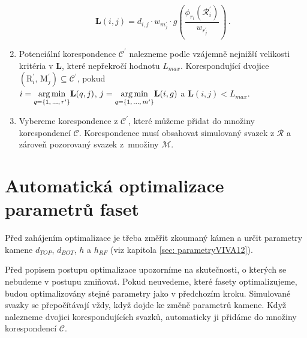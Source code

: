 \begin{enumerate}
\begin{equation}
\mathbf{L}(i,j) = d_{i,j}\cdot w_{m^\prime_{j}} \cdot g \left(\dfrac{\phi_{r_i}(\mathcal{R}^\prime_i)}{w_{r^\prime_{j}}} \right)\,. 
\label{eq: L_tok}
\end{equation}


\item Potenciální korespondence $\mathcal{C}^\prime$ nalezneme podle vzájemně nejnižší velikosti  kritéria v $\mathbf{L}$, které nepřekročí hodnotu $L_{max}$. Korespondující dvojice $\left(\mathrm{R}^\prime_i,\,\mathrm{M}^\prime_j \right) \subseteq \mathcal{C}^\prime$, pokud\\ $i = \underset{{q = \lbrace1,\,\dots,\,r^\prime\rbrace}}{\operatorname*{arg\,min}}\mathbf{L}(q,j)$, $j = \underset{{q = \lbrace1,\,\dots,\,m^\prime\rbrace}}{\operatorname*{arg\,min}}\mathbf{L}(i,g)$ a  $\mathbf{L}(i,j) < L_{max}$. 

\item Vybereme korespondence z $\mathcal{C}^\prime$, které můžeme přidat do množiny korespondencí $\mathcal{C}$. Korespondence musí obsahovat simulovaný svazek z $\mathcal{R}$ a zároveň pozorovaný svazek z~množiny $\mathcal{M}$. 
\end{enumerate}

\section{Automatická optimalizace parametrů faset}
\label{sec: auto}

Před zahájením optimalizace je třeba změřit zkoumaný kámen a určit parametry kamene $d_{TOP}$, $d_{BOT}$, $h$ a $h_{RF}$ (viz kapitola \ref{sec: parametryVIVA12}). 

Před popisem postupu optimalizace upozorníme na skutečnosti, o kterých se nebudeme v postupu zmiňovat. Pokud neuvedeme, které fasety optimalizujeme, budou optimalizovány stejné parametry jako v předchozím kroku. Simulované svazky se přepočítávají vždy, když dojde ke změně parametrů kamene. Když nalezneme dvojici korespondujících svazků, automaticky ji přidáme do množiny korespondencí $\mathcal{C}$.  

